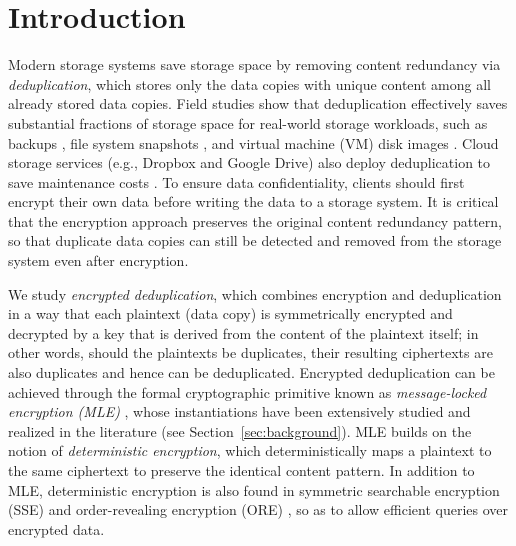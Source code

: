 \documentclass[bachelor]{thesis-uestc}
\begin{document}
\chapter{Introduction}
\label{sec:introduction}

Modern storage systems save storage space by removing content redundancy 
via {\em deduplication}, which stores only the data copies with unique content
among all already stored data copies.  Field studies show that deduplication
effectively saves substantial fractions of storage space for real-world
storage workloads, such as backups
\cite{zhu08,lillibridge09,wallace12,douglis17}, file system snapshots
\cite{meyer11}, and virtual machine (VM) disk images \cite{jin09}.  Cloud
storage services (e.g., Dropbox and Google Drive) also deploy deduplication to
save maintenance costs \cite{harnik10}. 
To ensure data confidentiality, clients should first encrypt their own data
before writing the data to a storage system.  It is critical that the
encryption approach preserves the original content redundancy pattern, so that
duplicate data copies can still be detected and removed from the storage
system even after encryption. 

We study {\em encrypted deduplication}, which combines encryption and
deduplication in a way that each plaintext (data copy) is symmetrically
encrypted and decrypted by a key that is derived from the content of the
plaintext itself; in other words, should the plaintexts be duplicates, their
resulting ciphertexts are also duplicates and hence can be deduplicated.
Encrypted deduplication can be achieved through the formal cryptographic
primitive known as {\em message-locked encryption (MLE)} \cite{bellare13a},
whose instantiations have been extensively studied and realized in the
literature (see Section~\ref{sec:background}).  MLE builds on the notion of
{\em deterministic encryption}, which deterministically maps a plaintext to
the same ciphertext to preserve the identical content pattern.  In addition to
MLE, deterministic encryption is also found in symmetric searchable encryption
(SSE) \cite{song00} and order-revealing encryption (ORE) \cite{boldyreva09},
so as to allow efficient queries over encrypted data. 

\end{document}
